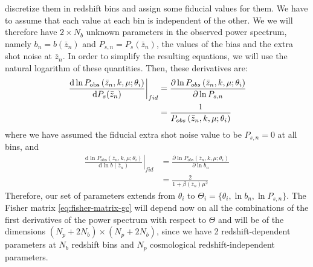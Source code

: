 discretize them in redshift bins and assign some fiducial values for them. We have to assume that each value at each bin is independent of the other.
We we will therefore have $2 \times N_b$ unknown parameters in the observed power spectrum, namely $b_n = b(\bar{z}_n)$ and $P_{s,n} = P_{s}(\bar{z}_n)$,
the values of the bias and the extra shot noise at $\bar{z}_n$.
In order to simplify the resulting equations, we will use the natural logarithm of these quantities.
Then, these derivatives are:
\begin{align}\label{eq:derivatives-of-lnPobs-dPs} 
\left.\frac{\mbox{d}\ln P_{{\rm obs}}\left(\bar{z}_n,k,\mu;\theta_{i}\right)}{\mbox{d} P_{s}(\bar{z}_n)}\right|_{fid} 
& =\frac{\partial\ln P_{obs}\left(\bar{z}_n,k,\mu;\theta_{i}\right)}{\partial \ln P_{s,n}} \nonumber \\
& =\frac{1}{P_{obs}\left(\bar{z}_n,k,\mu;\theta_{i}\right)}
\end{align}
where we have assumed the fiducial extra shot noise value to be $P_{s,n} = 0$ at all bins, and
\begin{align}\label{eq:derivatives-of-lnPobs-dbias} 
\left.\frac{\mbox{d}\ln P_{\mathrm{obs}}\left( \bar{z}_n , k, \mu; \theta_{i} \right) }{ \mbox{d} \ln b(\bar{z}_n) }\right|_{fid} 
& =\frac{\partial\ln P_{obs}\left( \bar{z}_n,k,\mu; \theta_{i} \right) }{ \partial \ln b_{n} } \nonumber \\
& =\frac{2}{1+\beta(\bar{z}_n)\mu^{2}}
\end{align}
Therefore, our set of parameters extends from $\theta_i$ to $\Theta_i = \{ \theta_i, \ln b_{n}, \ln P_{s,n} \}$.
The Fisher matrix \cref{eq:fisher-matrix-gc} will depend now on all the combinations of the first derivatives of the power spectrum
with respect to $\Theta$ and will be of the dimensions $(N_p + 2 N_b) \times (N_p + 2 N_b)$, since we have 2 redshift-dependent
parameters at $N_b$ redshift bins and $N_p$ cosmological redshift-independent parameters.

